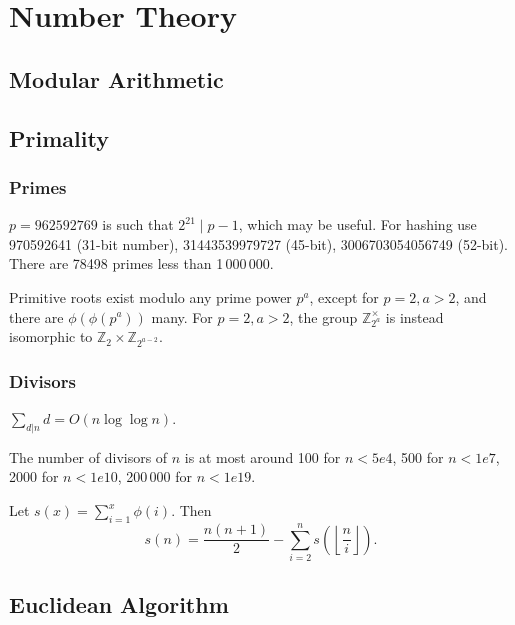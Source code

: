 \chapter{Number Theory}

\section{Modular Arithmetic}

\section{Primality}
	\subsection{Primes}
	$p=962592769$ is such that $2^{21} \mid p-1$, which may be useful. For hashing
	use 970592641 (31-bit number), 31443539979727 (45-bit), 3006703054056749
	(52-bit). There are 78498 primes less than 1\,000\,000.

	Primitive roots exist modulo any prime power $p^a$, except for $p = 2, a > 2$, and there are $\phi(\phi(p^a))$ many.
	For $p = 2, a > 2$, the group $\mathbb Z_{2^a}^\times$ is instead isomorphic to $\mathbb Z_2 \times \mathbb Z_{2^{a-2}}$.

	\subsection{Divisors}
	$\sum_{d|n} d = O(n \log \log n)$.

	The number of divisors of $n$ is at most around 100 for $n < 5e4$, 500 for $n < 1e7$, 2000 for $n < 1e10$, 200\,000 for $n < 1e19$.

	Let $s(x)=\sum_{i=1}^x\phi(i).$ Then 
	$$s(n)=\frac{n(n+1)}{2}-\sum_{i=2}^ns\left(\left\lfloor\frac{n}{i}\right\rfloor\right).$$


\section{Euclidean Algorithm}


